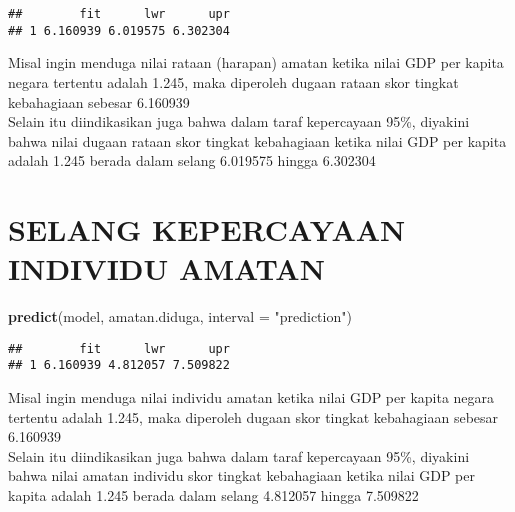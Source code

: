 \documentclass[
]{article}
\newenvironment{Shaded}{\begin{snugshade}}{\end{snugshade}}
\newcommand{\AttributeTok}[1]{\textcolor[rgb]{0.13,0.29,0.53}{#1}}
\newcommand{\FunctionTok}[1]{\textcolor[rgb]{0.13,0.29,0.53}{\textbf{#1}}}
\newcommand{\NormalTok}[1]{#1}
\newcommand{\StringTok}[1]{\textcolor[rgb]{0.31,0.60,0.02}{#1}}
\begin{document}
\begin{verbatim}
##        fit      lwr      upr
## 1 6.160939 6.019575 6.302304
\end{verbatim}

Misal ingin menduga nilai rataan (harapan) amatan ketika nilai GDP per
kapita negara tertentu adalah 1.245, maka diperoleh dugaan rataan skor
tingkat kebahagiaan sebesar 6.160939\\
Selain itu diindikasikan juga bahwa dalam taraf kepercayaan 95\%,
diyakini bahwa nilai dugaan rataan skor tingkat kebahagiaan ketika nilai
GDP per kapita adalah 1.245 berada dalam selang 6.019575 hingga 6.302304

\hypertarget{selang-kepercayaan-individu-amatan}{%
\section{\texorpdfstring{ SELANG KEPERCAYAAN INDIVIDU
AMATAN}{ SELANG KEPERCAYAAN INDIVIDU AMATAN}}\label{selang-kepercayaan-individu-amatan}}

\begin{Shaded}
\begin{Highlighting}[]
\FunctionTok{predict}\NormalTok{(model, amatan.diduga, }\AttributeTok{interval =} \StringTok{"prediction"}\NormalTok{)}
\end{Highlighting}
\end{Shaded}

\begin{verbatim}
##        fit      lwr      upr
## 1 6.160939 4.812057 7.509822
\end{verbatim}

Misal ingin menduga nilai individu amatan ketika nilai GDP per kapita
negara tertentu adalah 1.245, maka diperoleh dugaan skor tingkat
kebahagiaan sebesar 6.160939\\
Selain itu diindikasikan juga bahwa dalam taraf kepercayaan 95\%,
diyakini bahwa nilai amatan individu skor tingkat kebahagiaan ketika
nilai GDP per kapita adalah 1.245 berada dalam selang 4.812057 hingga
7.509822
\end{document}
